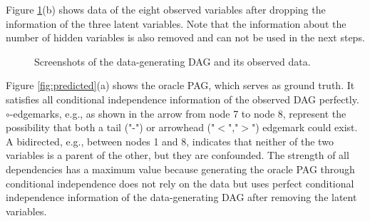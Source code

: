 \documentclass[conference]{IEEEtran}
\begin{document}
Figure \ref{fig:DAG}(b) shows data of the eight observed variables after dropping the information of the three latent variables. Note that the information about the number of hidden variables is also removed and can not be used in the next steps.
\begin{figure}[htbp]
    \centering
    \caption{Screenshots of the data-generating DAG and its observed data.}
        \label{fig:DAG}
\end{figure}


Figure \ref{fig:predicted}(a) shows the oracle PAG, which serves as ground truth. It satisfies all conditional independence information of the observed DAG perfectly.
$\circ$-edgemarks, e.g., as shown in the arrow from node 7 to node 8, represent the possibility that both a tail ("-") or arrowhead ("$<$","$>$") edgemark could exist.
A bidirected, e.g., between nodes 1 and 8, indicates that neither of the two variables is a parent of the other, but they are confounded.
The strength of all dependencies has a maximum value because generating the oracle PAG through conditional independence does not rely on the data but uses perfect conditional independence information of the data-generating DAG after removing the latent variables.
\end{document}
